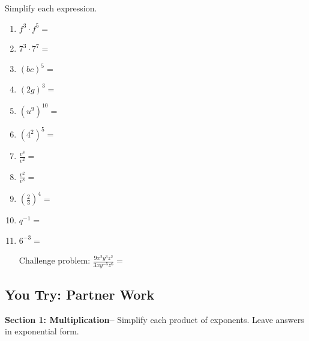 \documentclass[12pt]{article}
\begin{document}
Simplify each expression.\\

\begin{enumerate}

	\item $f^3 \cdot f^5=$\\
	
	\item $7^3 \cdot 7^7=$\\
	
	\item $(bc)^5=$\\
	
	\item $(2g)^3=$\\
	
	\item $(u^9)^{10}=$\\
	
	\item $ (4^2)^5=$\\
	
	\item $\frac{v^8}{v^2}=$\\
	
	\item $\frac{v^2}{v^8}=$\\
	
	\item $\left(\frac{2}{3}\right)^4=$\\
	
	\item $q^{-1}=$\\
	
	\item $6^{-3}=$\\
	
	\vspace{1cm}
	
	Challenge problem: $\frac{9x^2y^3z^{2}}{3xy^{-5}z^{6}}=$\\

\end{enumerate}	
	
\pagebreak

\subsection{You Try: Partner Work}


\textbf{Section 1: Multiplication--} Simplify each product of exponents. Leave answers in exponential form.\\
\end{document}
